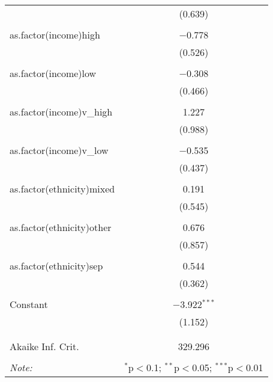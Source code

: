 \documentclass[12pt,letterpaper]{article}
\begin{document}
\begin{table}[!htbp]
\begin{adjustbox}{max width=\textwidth}
\begin{tabular}{@{\extracolsep{2pt}}lc}
		& (0.639) \\ 
		& \\ 
		as.factor(income)high & $-$0.778 \\ 
		& (0.526) \\ 
		& \\ 
		as.factor(income)low & $-$0.308 \\ 
		& (0.466) \\ 
		& \\ 
		as.factor(income)v\_high & 1.227 \\ 
		& (0.988) \\ 
		& \\ 
		as.factor(income)v\_low & $-$0.535 \\ 
		& (0.437) \\ 
		& \\ 
		as.factor(ethnicity)mixed & 0.191 \\ 
		& (0.545) \\ 
		& \\ 
		as.factor(ethnicity)other & 0.676 \\ 
		& (0.857) \\ 
		& \\ 
		as.factor(ethnicity)sep & 0.544 \\ 
		& (0.362) \\ 
		& \\ 
		Constant & $-$3.922$^{***}$ \\ 
		& (1.152) \\ 
		& \\ 
		\hline \\[-1.8ex] 
		Akaike Inf. Crit. & 329.296 \\ 
		\hline 
		\hline \\[-1.8ex] 
		\textit{Note:}  & \multicolumn{1}{r}{$^{*}$p$<$0.1; $^{**}$p$<$0.05; $^{***}$p$<$0.01} \\ 
	\end{tabular} 
\end{adjustbox}
\end{table} 
\end{document}
